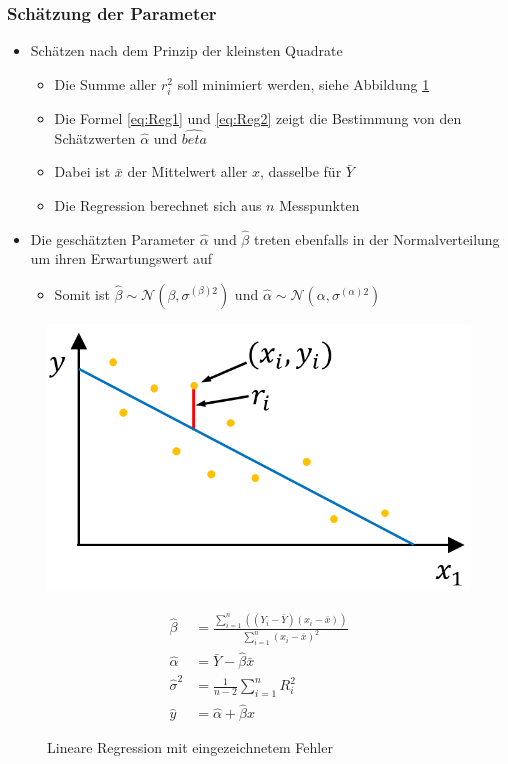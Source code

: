 \subsubsection{Schätzung der Parameter}
\begin{itemize}
	\item Schätzen nach dem Prinzip der kleinsten Quadrate
	\begin{itemize}
		\item Die Summe aller $r_i^2$ soll minimiert werden, siehe Abbildung \ref{fig:reg1}
		\item Die Formel \ref{eq:Reg1} und \ref{eq:Reg2} zeigt die Bestimmung von den Schätzwerten $\hat{\alpha}$ und $\hat{beta}$ 
		\item Dabei ist $\bar{x}$ der Mittelwert aller $x$, dasselbe für $\bar{Y}$
		\item Die Regression berechnet sich aus $n$ Messpunkten
	\end{itemize}
	\item Die geschätzten Parameter $\hat{\alpha}$ und $\hat{\beta}$  treten ebenfalls in der Normalverteilung um ihren Erwartungswert auf
	\begin{itemize}
		\item Somit ist $\hat{\beta}\sim\mathcal{N}\left(\beta,\sigma^{(\beta)2}\right)$ und $\hat{\alpha}\sim\mathcal{N}\left(\alpha,\sigma^{(\alpha)2}\right)$	
	\end{itemize}
\end{itemize}
\begin{figure}[h!]
	\begin{minipage}{0.4\linewidth}
		\includegraphics[width=0.8\linewidth]{figures/Reg1}
		\caption{Lineare Regression mit eingezeichnetem Fehler}
		\label{fig:reg1}
	\end{minipage}
	\begin{minipage}{0.7\linewidth}
		\begin{align}
			\label{eq:Reg1}
			\hat{\beta}&=\frac{\sum_{i=1}^{n}\left(\left(Y_i-\bar{Y}\right)\left(x_i-\bar{x}\right)\right)}{\sum_{i=1}^{n}\left(x_i-\bar{x}\right)^2}\\
			\label{eq:Reg2}
			\hat{\alpha}&= \bar{Y}-\hat{\beta}\bar{x}\\
			\label{eq:RegVarianz}
			\hat{\sigma}^2&=\frac{1}{n-2}\sum_{i=1}^{n}R_i^2\\
			\hat{y} &= \hat{\alpha}+\hat{\beta}x
		\end{align}
	\end{minipage}
\end{figure}

